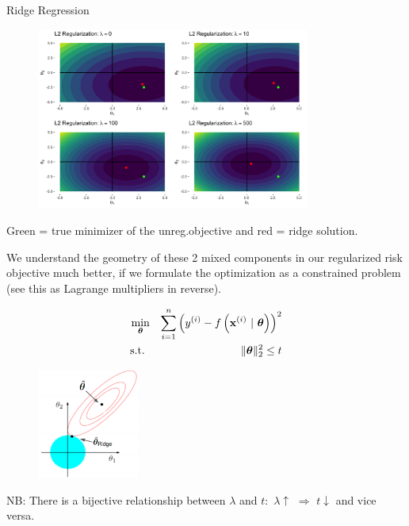 \documentclass[11pt,compress,t,notes=noshow, xcolor=table]{beamer}
\begin{document}
\begin{vbframe}{Ridge Regression}
\begin{figure}
\includegraphics[width=0.8\textwidth]{figure/ridge_contours.png}
\end{figure}
\vspace{-0.2cm}
Green  = true minimizer of the unreg.objective and red = ridge solution.

\framebreak

We understand the geometry of these 2 mixed components in our regularized risk objective much better, if we formulate the optimization as a constrained problem (see this as Lagrange multipliers in reverse).

\vspace{-0.5cm}

\begin{eqnarray*}
\min_{\bm{\theta}} && \sum\limits_{i=1}^n \left(y^{(i)} - f\left(\mathbf{x}^{(i)} ~|~ \bm{\theta}\right)\right)^2 \\
  \text{s.t. } && \|\bm{\theta}\|_2^2  \leq t \\
\end{eqnarray*}

\vspace{-1.0cm}

\begin{figure}
\includegraphics[width=0.3\textwidth]{figure_man/ridge_hat.png}
\end{figure}

\begin{footnotesize} 
NB: There is a bijective relationship between $\lambda$ and $t$: $\, \lambda \uparrow \,\, \Rightarrow \,\, t \downarrow$ and vice versa.
\end{footnotesize}


\end{vbframe}
\end{document}
